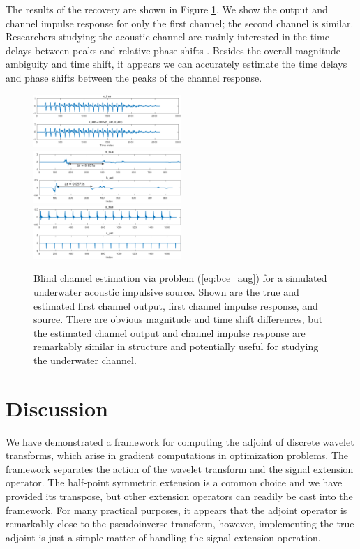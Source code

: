 \documentclass[journal]{IEEEtran}
\begin{document}
The results of the recovery are shown in Figure \ref{fig:bce_rec}.  We show the output and channel impulse response for only the first channel; the second channel is similar.  Researchers studying the acoustic channel are mainly interested in the time delays between peaks and relative phase shifts \cite{rideout_2016}.  Besides the overall magnitude ambiguity and time shift, it appears we can accurately estimate the time delays and phase shifts between the peaks of the channel response.

\begin{figure}
   \centering
   \includegraphics[width=0.5\textwidth]{fig4a.pdf} 
   \includegraphics[width=0.5\textwidth]{fig4b.pdf}
   \includegraphics[width=0.5\textwidth]{fig4c.pdf}
   \caption{Blind channel estimation via problem (\ref{eq:bce_aug}) for a simulated underwater acoustic impulsive source.  Shown are the true and estimated first channel output, first channel impulse response, and source.  There are obvious magnitude and time shift differences, but the estimated channel output and channel impulse response are remarkably similar in structure and potentially useful for studying the underwater channel.}
   \label{fig:bce_rec}
\end{figure}



\section{Discussion}
We have demonstrated a framework for computing the adjoint of discrete wavelet transforms, which arise in gradient computations in optimization problems.  The framework separates the action of the wavelet transform and the signal extension operator.  The half-point symmetric extension is a common choice and we have provided its transpose, but other extension operators can readily be cast into the framework.  For many practical purposes, it appears that the adjoint operator is remarkably close to the pseudoinverse transform, however, implementing the true adjoint is just a simple matter of handling the signal extension operation.
\end{document}
